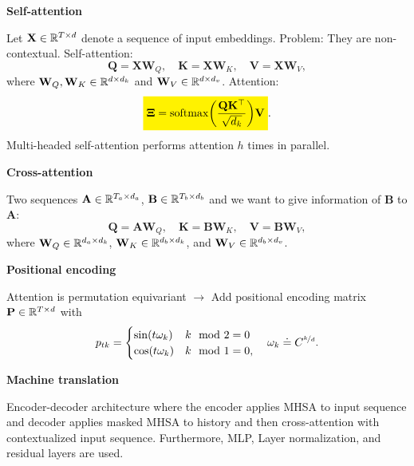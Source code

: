 \documentclass[10pt]{article}
\newenvironment{topic}[1]
{\textbf{\sffamily \footnotesize \colorbox{black}{\rlap{\textbf{\textcolor{white}{#1}}}\hspace{\linewidth}\hspace{-2\fboxsep}}}}
{}
\newenvironment{subtopic}[1]
{\begin{center}\textbf{\footnotesize \sffamily #1}\end{center}}
{}
\renewcommand{\mat}[1]{\ensuremath{\mathbf{#1}}}
\begin{document}
\begin{multicols*}{3}
\begin{topic}{Recurrent neural networks}
    \end{topic}

    \begin{topic}{Transformers}

        \begin{subtopic}{Self-attention}
            Let $\mat{X} \in \R^{T \times d}$ denote a sequence of input embeddings. Problem: They are non-contextual. Self-attention: \[
                \mat{Q} = \mat{X} \mat{W}_Q, \quad \mat{K} = \mat{X} \mat{W}_K, \quad \mat{V} = \mat{X}\mat{W}_V,
            \]
            where $\mat{W}_Q, \mat{W}_K \in \R^{d\times d_k}$ and $\mat{W}_V \in \R^{d \times d_v}$. Attention: \[
                \colorbox{yellow}{$\displaystyle \mat{\Xi} = \mathrm{softmax} \lft( \frac{\mat{Q} \transpose{\mat{K}}}{\sqrt{d_k}} \rgt) \mat{V}$}.
            \]
            Multi-headed self-attention performs attention $h$ times in parallel.
        \end{subtopic}

        \begin{subtopic}{Cross-attention}
            Two sequences $\mat{A} \in \R^{T_a \times d_a}$, $\mat{B} \in \R^{T_b \times d_b}$ and we want to give information of $\mat{B}$ to $\mat{A}$: \[
                \mat{Q} = \mat{A}\mat{W}_Q, \quad \mat{K} = \mat{B} \mat{W}_K, \quad \mat{V} = \mat{B}\mat{W}_V,
            \]
            where $\mat{W}_Q \in \R^{d_a \times d_k}$, $\mat{W}_K \in \R^{d_b\times d_k}$, and $\mat{W}_V \in
                \R^{d_b \times d_v}$.

        \end{subtopic}

        \begin{subtopic}{Positional encoding}
            Attention is permutation equivariant $\to$ Add positional encoding matrix $\mat{P} \in \R^{T \times d}$ with \[
                p_{tk} = \begin{cases}
                    \sin(t \omega_k) & k \mod 2 = 0  \\
                    \cos(t \omega_k) & k \mod 1 = 0,
                \end{cases}
                \quad \omega_k \doteq C^{\nicefrac{k}{d}}.
            \]
        \end{subtopic}

        \begin{subtopic}{Machine translation}
            Encoder-decoder architecture where the encoder applies MHSA to input sequence and decoder
            applies masked MHSA to history and then cross-attention with contextualized input
            sequence. Furthermore, MLP, Layer normalization, and residual layers are used.
        \end{subtopic}


\end{topic}
\end{multicols*}
\end{document}
